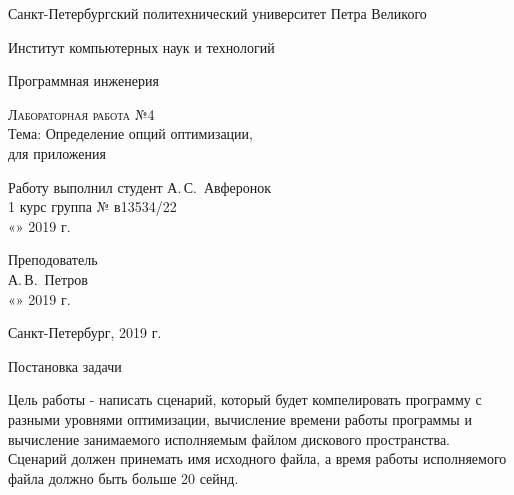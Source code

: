\documentclass[12pt,a4paper]{scrartcl}
\begin{document}
\begin{titlepage}
  \begin{center}
    \large




    \vspace{0.5cm}

    Санкт-Петербургский политехнический университет Петра Великого
    \vspace{0.25cm}
    
    Институт компьютерных наук и технологий
    
    Программная инженерия
    \vfill

    \textsc{Лабораторная работа №4}\\[5mm]
    \bigskip
    {\LARGE Тема: Определение опций оптимизации,\\
      для приложения}
  \bigskip
    
    
\end{center}
\vfill

 \newlength{\ML}
\hfill\begin{minipage}{0.5\textwidth}
Работу выполнил студент
  \underline{\hspace{\ML}} А.\,С.~Авферонок\\
1 курс группа № в13534/22\\
  «\underline{\hspace{0.7cm}}» \underline{\hspace{2cm}} 2019 г.
\end{minipage}%
\bigskip
\vfill
 \newlength{\ML}

\hfill\begin{minipage}{0.5\textwidth}
  Преподователь\\
  \underline{\hspace{\ML}} А.\,В.~Петров\\
  «\underline{\hspace{0.7cm}}» \underline{\hspace{2cm}} 2019 г.
\end{minipage}%
\bigskip
\vfill

\begin{center}
  Санкт-Петербург, 2019 г.
\end{center}
\end{titlepage}
\newpage
\begin{center}
    {\LARGE Постановка задачи}
\end{center}
\par
Цель работы - написать сценарий, который будет компелировать программу с разными уровнями оптимизации, 
вычисление времени работы программы и вычисление занимаемого исполняемым файлом дискового пространства.
Сценарий должен принемать имя исходного файла, а время работы исполняемого файла должно быть больше 20 
сейнд.
\end{document}
